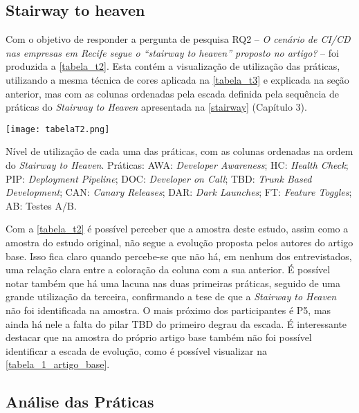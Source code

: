 \subsection{Stairway to heaven}

Com o objetivo de responder a pergunta de pesquisa RQ2 -- \emph{O cenário de CI/CD nas empresas em Recife segue o ``stairway to heaven'' proposto no artigo?} -- foi produzida a \ref{tabela_t2}. Esta contém a visualização de utilização das práticas, utilizando a mesma técnica de cores aplicada na \ref{tabela_t3} e explicada na seção anterior, mas com as colunas ordenadas pela escada definida pela sequência de práticas do \emph{Stairway to Heaven} apresentada na \ref{stairway} (Capítulo 3).

\begin{table}[ht]
\begin{center}
\texttt{[image: tabelaT2.png]}
\end{center}
\caption[Nível de utilização das práticas, com as colunas na ordem do \emph{Stairway to Heaven}]{
    Nível de utilização de cada uma das práticas, com as colunas ordenadas na ordem do \emph{Stairway to Heaven}. Práticas: AWA: \emph{Developer Awareness}; HC: \emph{Health Check}; PIP: \emph{Deployment Pipeline}; DOC: \emph{Developer on Call}; TBD: \emph{Trunk Based Development}; CAN: \emph{Canary Releases}; DAR: \emph{Dark Launches}; FT: \emph{Feature Toggles}; AB: Testes A/B.
}\label{tabela_t2}
\end{table}

Com a \ref{tabela_t2} é possível perceber que a amostra deste estudo, assim como a amostra do estudo original, não segue a evolução proposta pelos autores do artigo base. Isso fica claro quando percebe-se que não há, em nenhum dos entrevistados, uma relação clara entre a coloração da coluna com a sua anterior. É possível notar também que há uma lacuna nas duas primeiras práticas, seguido de uma grande utilização da terceira, confirmando a tese de que a \emph{Stairway to Heaven} não foi identificada na amostra. O mais próximo dos participantes é P5, mas ainda há nele a falta do pilar TBD do primeiro degrau da escada. É interessante destacar que na amostra do próprio artigo base também não foi possível identificar a escada de evolução, como é possível visualizar na \ref{tabela_1_artigo_base}.

\subsection{Análise das Práticas}

